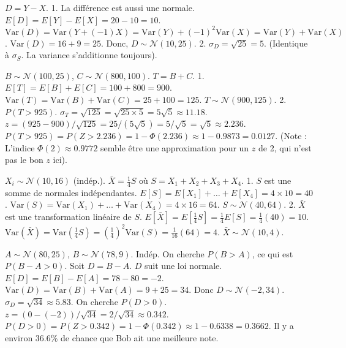 \begin{correctionbox}
$D = Y - X$.
1.  La différence est aussi une normale.
    $E[D] = E[Y] - E[X] = 20 - 10 = 10$.
    $\text{Var}(D) = \text{Var}(Y + (-1)X) = \text{Var}(Y) + (-1)^2 \text{Var}(X) = \text{Var}(Y) + \text{Var}(X)$.
    $\text{Var}(D) = 16 + 9 = 25$.
    Donc, $D \sim \mathcal{N}(10, 25)$.
2.  $\sigma_D = \sqrt{25} = 5$. (Identique à $\sigma_S$. La variance s'additionne toujours).
\end{correctionbox}

\begin{correctionbox}
$B \sim \mathcal{N}(100, 25)$, $C \sim \mathcal{N}(800, 100)$. $T = B+C$.
1.  $E[T] = E[B] + E[C] = 100 + 800 = 900$.
    $\text{Var}(T) = \text{Var}(B) + \text{Var}(C) = 25 + 100 = 125$.
    $T \sim \mathcal{N}(900, 125)$.
2.  $P(T > 925)$. $\sigma_T = \sqrt{125} = \sqrt{25 \times 5} = 5\sqrt{5} \approx 11.18$.
    $z = (925 - 900) / \sqrt{125} = 25 / (5\sqrt{5}) = 5/\sqrt{5} = \sqrt{5} \approx 2.236$.
    $P(T > 925) = P(Z > 2.236) = 1 - \Phi(2.236) \approx 1 - 0.9873 = 0.0127$.
    (Note : L'indice $\Phi(2) \approx 0.9772$ semble être une approximation pour un $z$ de 2, qui n'est pas le bon $z$ ici).
\end{correctionbox}

\begin{correctionbox}
$X_i \sim \mathcal{N}(10, 16)$ (indép.). $\bar{X} = \frac{1}{4} S$ où $S = X_1+X_2+X_3+X_4$.
1.  $S$ est une somme de normales indépendantes.
    $E[S] = E[X_1] + \dots + E[X_4] = 4 \times 10 = 40$.
    $\text{Var}(S) = \text{Var}(X_1) + \dots + \text{Var}(X_4) = 4 \times 16 = 64$.
    $S \sim \mathcal{N}(40, 64)$.
2.  $\bar{X}$ est une transformation linéaire de $S$.
    $E[\bar{X}] = E[\frac{1}{4}S] = \frac{1}{4}E[S] = \frac{1}{4}(40) = 10$.
    $\text{Var}(\bar{X}) = \text{Var}(\frac{1}{4}S) = (\frac{1}{4})^2 \text{Var}(S) = \frac{1}{16}(64) = 4$.
    $\bar{X} \sim \mathcal{N}(10, 4)$.
\end{correctionbox}

\begin{correctionbox}
$A \sim \mathcal{N}(80, 25)$, $B \sim \mathcal{N}(78, 9)$. Indép.
On cherche $P(B > A)$, ce qui est $P(B - A > 0)$.
Soit $D = B - A$. $D$ suit une loi normale.
$E[D] = E[B] - E[A] = 78 - 80 = -2$.
$\text{Var}(D) = \text{Var}(B) + \text{Var}(A) = 9 + 25 = 34$.
Donc $D \sim \mathcal{N}(-2, 34)$. $\sigma_D = \sqrt{34} \approx 5.83$.
On cherche $P(D > 0)$.
$z = (0 - (-2)) / \sqrt{34} = 2 / \sqrt{34} \approx 0.342$.
$P(D > 0) = P(Z > 0.342) = 1 - \Phi(0.342) \approx 1 - 0.6338 = 0.3662$.
Il y a environ 36.6\% de chance que Bob ait une meilleure note.
\end{correctionbox}